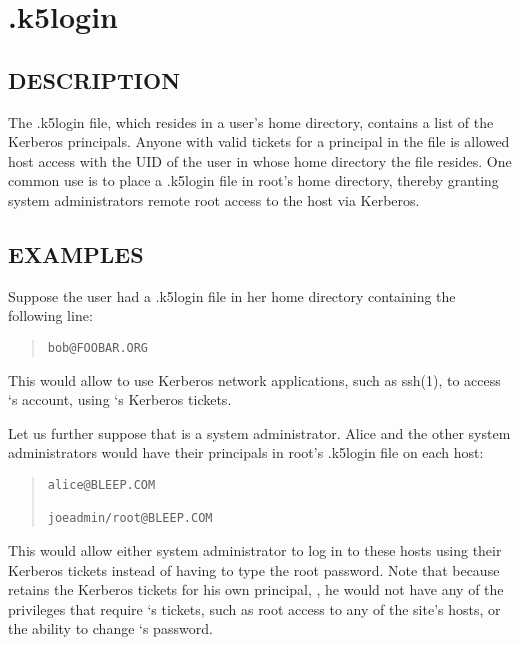 \documentclass[letterpaper,10pt,english]{sphinxmanual}
\begin{document}
\section{.k5login}
\label{user/user_config/k5login:k5login-5}\label{user/user_config/k5login:k5login}\label{user/user_config/k5login::doc}

\subsection{DESCRIPTION}
\label{user/user_config/k5login:description}
The .k5login file, which resides in a user's home directory, contains
a list of the Kerberos principals.  Anyone with valid tickets for a
principal in the file is allowed host access with the UID of the user
in whose home directory the file resides.  One common use is to place
a .k5login file in root's home directory, thereby granting system
administrators remote root access to the host via Kerberos.


\subsection{EXAMPLES}
\label{user/user_config/k5login:examples}
Suppose the user  had a .k5login file in her home directory
containing the following line:
\begin{quote}

\begin{Verbatim}[commandchars=\\\{\}]
bob@FOOBAR.ORG
\end{Verbatim}
\end{quote}

This would allow  to use Kerberos network applications, such as
ssh(1), to access `s account, using `s Kerberos
tickets.

Let us further suppose that  is a system administrator.
Alice and the other system administrators would have their principals
in root's .k5login file on each host:
\begin{quote}

\begin{Verbatim}[commandchars=\\\{\}]
alice@BLEEP.COM

joeadmin/root@BLEEP.COM
\end{Verbatim}
\end{quote}

This would allow either system administrator to log in to these hosts
using their Kerberos tickets instead of having to type the root
password.  Note that because  retains the Kerberos tickets for
his own principal, , he would not have any of the
privileges that require `s tickets, such as root access to
any of the site's hosts, or the ability to change `s
password.
\end{document}
